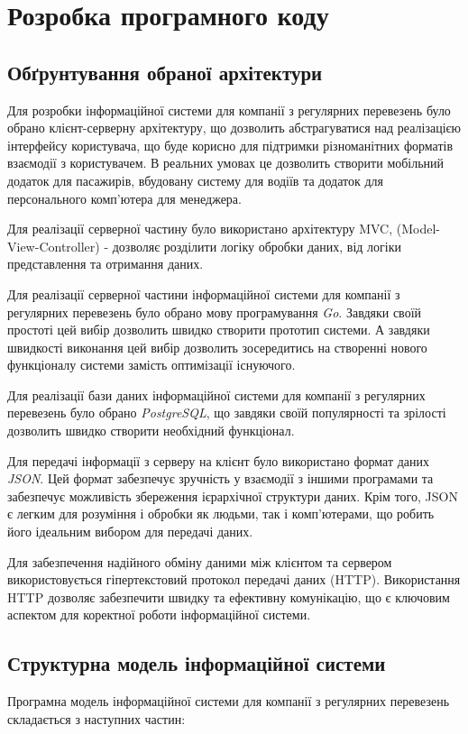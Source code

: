 \documentclass[oneside,14pt]{extarticle}
\begin{document}
\newpage

\section{Розробка програмного коду}
\subsection{Обґрунтування обраної архітектури}
Для розробки інформаційної системи для компанії з регулярних перевезень було обрано клієнт-серверну архітектуру, що дозволить абстрагуватися над реалізацією інтерфейсу користувача, що буде корисно для підтримки різноманітних форматів взаємодії з користувачем. В реальних умовах це дозволить створити мобільний додаток для пасажирів, вбудовану систему для водіїв та додаток для персонального комп'ютера для менеджера.

Для реалізації серверної частину було використано архітектуру MVC, (Model-View-Controller) - дозволяє розділити логіку обробки даних, від логіки представлення та отримання даних.

Для реалізації серверної частини інформаційної системи для компанії з регулярних перевезень було обрано мову програмування \textit{Go}. Завдяки своїй простоті цей вибір дозволить швидко створити прототип системи. А завдяки швидкості виконання цей вибір дозволить зосередитись на створенні нового функціоналу системи замість оптимізації існуючого.

Для реалізації бази даних інформаційної системи для компанії з регулярних перевезень було обрано \textit{PostgreSQL}, що завдяки своїй популярності та зрілості дозволить швидко створити необхідний функціонал.

Для передачі інформації з серверу на клієнт було використано формат даних \textit{JSON}. Цей формат забезпечує зручність у взаємодії з іншими програмами та забезпечує можливість збереження ієрархічної структури даних. Крім того, JSON є легким для розуміння і обробки як людьми, так і комп'ютерами, що робить його ідеальним вибором для передачі даних.

Для забезпечення надійного обміну даними між клієнтом та сервером використовується гіпертекстовий протокол передачі даних (HTTP). Використання HTTP дозволяє забезпечити швидку та ефективну комунікацію, що є ключовим аспектом для коректної роботи інформаційної системи.

\subsection{Структурна модель інформаційної системи}
Програмна модель інформаційної системи для компанії з регулярних перевезень складається з наступних  частин:
\end{document}
